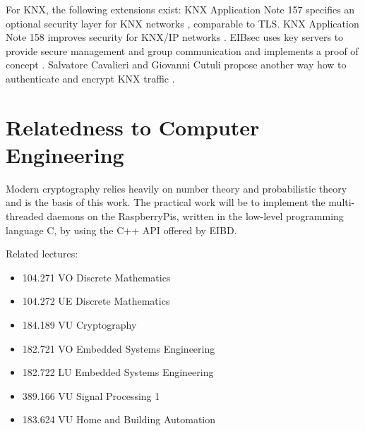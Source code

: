 \documentclass[a4paper,11pt,oneside]{memoir}
\begin{document}
For KNX, the following extensions exist:
KNX Application Note 157 specifies an optional security layer for KNX networks \cite{knx_data_sec}, comparable to TLS.
KNX Application Note 158 improves security for KNX/IP networks \cite{knx_ip_sec}.
EIBsec uses key servers to provide secure management and group communication and implements a proof of
concept \cite{KraInnosec2013}. Salvatore Cavalieri and Giovanni Cutuli propose another way how to authenticate and encrypt KNX traffic \cite{knxsec}.

\section{Relatedness to Computer Engineering}

Modern cryptography relies heavily on number theory and probabilistic theory and is the basis of this work.
The practical work will be to implement the multi-threaded daemons on the RaspberryPis, written in the low-level programming language
C, by using the C++ API offered by EIBD.

Related lectures:

\begin{itemize}
 \item 104.271 VO Discrete Mathematics 
 \item 104.272 UE Discrete Mathematics 
 \item 184.189 VU Cryptography 
 \item 182.721 VO Embedded Systems Engineering 
 \item 182.722 LU Embedded Systems Engineering 
 \item 389.166 VU Signal Processing 1
 \item 183.624 VU Home and Building Automation 

\end{itemize}

\printbibliography
\end{document}
